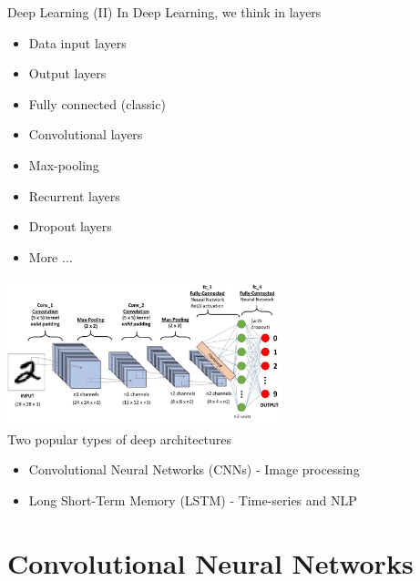 \documentclass[10pt,compress]{beamer} %
\begin{document}
\begin{frame}{Deep Learning (II)}
	In Deep Learning, we think in layers
	\begin{itemize}
		\item Data input layers
		\item Output layers
        \item Fully connected (classic)
        \item Convolutional layers
        \item Max-pooling
        \item Recurrent layers
        \item Dropout layers
        \item More ...
	\end{itemize}

    \vspace{-3.5cm}
	\hfill \includegraphics[width=0.6\textwidth]{figs/layers.png}\\

	Two popular types of deep architectures
	\begin{itemize}
		\item Convolutional Neural Networks (CNNs) - Image processing
		\item Long Short-Term Memory (LSTM) - Time-series and NLP 
	\end{itemize}
\end{frame}

\section{Convolutional Neural Networks}
\end{document}
